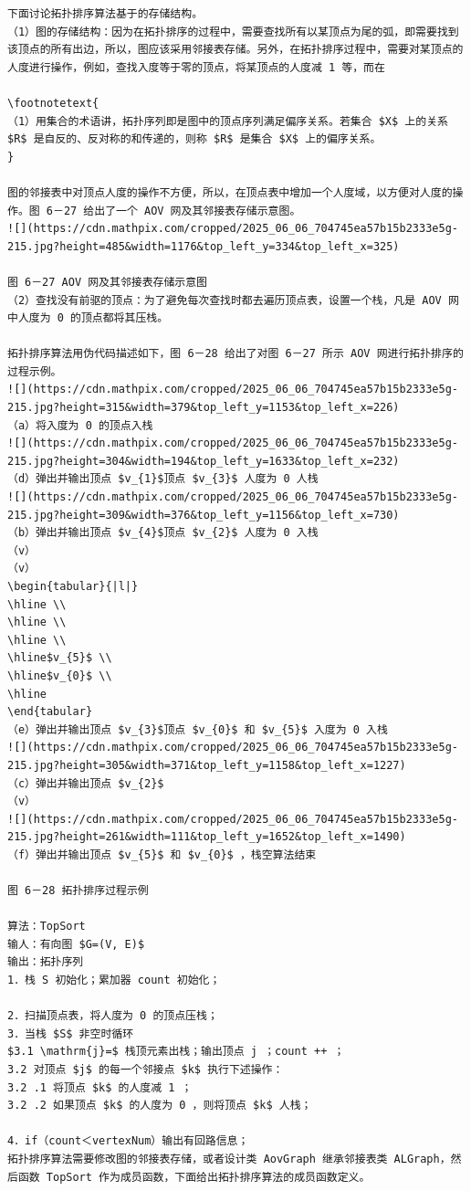 \documentclass[10pt]{article}
\let\svthefootnote\thefootnote
\newcommand\blfootnotetext[1]{%
  \let\thefootnote\relax\footnote{#1}%
  \addtocounter{footnote}{-1}%
  \let\thefootnote\svthefootnote%
}
\let\svfootnotetext\footnotetext
\renewcommand\footnotetext[2][?]{%
  \if\relax#1\relax%
    \ifnum\value{footnote}=0\blfootnotetext{#2}\else\svfootnotetext{#2}\fi%
  \else%
    \if?#1\ifnum\value{footnote}=0\blfootnotetext{#2}\else\svfootnotetext{#2}\fi%
    \else\svfootnotetext[#1]{#2}\fi%
  \fi
}
\begin{document}
\begin{verbatim}
下面讨论拓扑排序算法基于的存储结构。
（1）图的存储结构：因为在拓扑排序的过程中，需要查找所有以某顶点为尾的弧，即需要找到该顶点的所有出边，所以，图应该采用邻接表存储。另外，在拓扑排序过程中，需要对某顶点的人度进行操作，例如，查找入度等于零的顶点，将某顶点的人度减 1 等，而在

\footnotetext{
（1）用集合的术语讲，拓扑序列即是图中的顶点序列满足偏序关系。若集合 $X$ 上的关系 $R$ 是自反的、反对称的和传递的，则称 $R$ 是集合 $X$ 上的偏序关系。
}

图的邻接表中对顶点人度的操作不方便，所以，在顶点表中增加一个人度域，以方便对人度的操作。图 6－27 给出了一个 AOV 网及其邻接表存储示意图。
![](https://cdn.mathpix.com/cropped/2025_06_06_704745ea57b15b2333e5g-215.jpg?height=485&width=1176&top_left_y=334&top_left_x=325)

图 6－27 AOV 网及其邻接表存储示意图
（2）查找没有前驱的顶点：为了避免每次查找时都去遍历顶点表，设置一个栈，凡是 AOV 网中人度为 0 的顶点都将其压栈。

拓扑排序算法用伪代码描述如下，图 6－28 给出了对图 6－27 所示 AOV 网进行拓扑排序的过程示例。
![](https://cdn.mathpix.com/cropped/2025_06_06_704745ea57b15b2333e5g-215.jpg?height=315&width=379&top_left_y=1153&top_left_x=226)
（a）将入度为 0 的顶点入栈
![](https://cdn.mathpix.com/cropped/2025_06_06_704745ea57b15b2333e5g-215.jpg?height=304&width=194&top_left_y=1633&top_left_x=232)
（d）弹出并输出顶点 $v_{1}$顶点 $v_{3}$ 人度为 0 人栈
![](https://cdn.mathpix.com/cropped/2025_06_06_704745ea57b15b2333e5g-215.jpg?height=309&width=376&top_left_y=1156&top_left_x=730)
（b）弹出并输出顶点 $v_{4}$顶点 $v_{2}$ 人度为 0 入栈
（v）
（v）
\begin{tabular}{|l|}
\hline \\
\hline \\
\hline \\
\hline$v_{5}$ \\
\hline$v_{0}$ \\
\hline
\end{tabular}
（e）弹出并输出顶点 $v_{3}$顶点 $v_{0}$ 和 $v_{5}$ 入度为 0 入栈
![](https://cdn.mathpix.com/cropped/2025_06_06_704745ea57b15b2333e5g-215.jpg?height=305&width=371&top_left_y=1158&top_left_x=1227)
（c）弹出并输出顶点 $v_{2}$
（v）
![](https://cdn.mathpix.com/cropped/2025_06_06_704745ea57b15b2333e5g-215.jpg?height=261&width=111&top_left_y=1652&top_left_x=1490)
（f）弹出并输出顶点 $v_{5}$ 和 $v_{0}$ ，栈空算法结束

图 6－28 拓扑排序过程示例

算法：TopSort
输人：有向图 $G=(V, E)$
输出：拓扑序列
1．栈 S 初始化；累加器 count 初始化；

2．扫描顶点表，将人度为 0 的顶点压栈；
3．当栈 $S$ 非空时循环
$3.1 \mathrm{j}=$ 栈顶元素出栈；输出顶点 j ；count ++ ；
3.2 对顶点 $j$ 的每一个邻接点 $k$ 执行下述操作：
3.2 .1 将顶点 $k$ 的人度减 1 ；
3.2 .2 如果顶点 $k$ 的人度为 0 ，则将顶点 $k$ 人栈；

4．if（count＜vertexNum）输出有回路信息；
拓扑排序算法需要修改图的邻接表存储，或者设计类 AovGraph 继承邻接表类 ALGraph，然后函数 TopSort 作为成员函数，下面给出拓扑排序算法的成员函数定义。
\end{verbatim}
\end{document}
